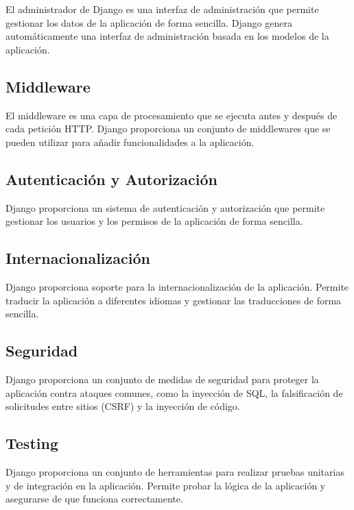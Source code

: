 \documentclass[
  a4paper,
  DIV=11,
  numbers=noendperiod,
  onepage,
  openany]{scrreprt}
\begin{document}
\begin{tcolorbox}
\begin{figure}[H]
\end{figure}%

El administrador de Django es una interfaz de administración que permite
gestionar los datos de la aplicación de forma sencilla. Django genera
automáticamente una interfaz de administración basada en los modelos de
la aplicación.

\subsection{Middleware}\label{middleware}

El middleware es una capa de procesamiento que se ejecuta antes y
después de cada petición HTTP. Django proporciona un conjunto de
middlewares que se pueden utilizar para añadir funcionalidades a la
aplicación.

\subsection{Autenticación y
Autorización}\label{autenticaciuxf3n-y-autorizaciuxf3n}

Django proporciona un sistema de autenticación y autorización que
permite gestionar los usuarios y los permisos de la aplicación de forma
sencilla.

\subsection{Internacionalización}\label{internacionalizaciuxf3n}

Django proporciona soporte para la internacionalización de la
aplicación. Permite traducir la aplicación a diferentes idiomas y
gestionar las traducciones de forma sencilla.

\subsection{Seguridad}\label{seguridad}

Django proporciona un conjunto de medidas de seguridad para proteger la
aplicación contra ataques comunes, como la inyección de SQL, la
falsificación de solicitudes entre sitios (CSRF) y la inyección de
código.

\subsection{Testing}\label{testing}

Django proporciona un conjunto de herramientas para realizar pruebas
unitarias y de integración en la aplicación. Permite probar la lógica de
la aplicación y asegurarse de que funciona correctamente.


\end{tcolorbox}
\end{document}
